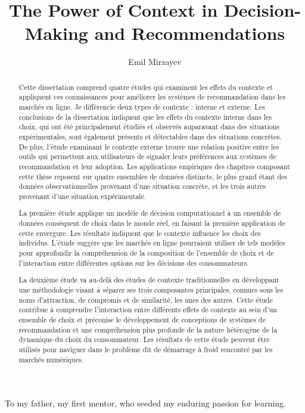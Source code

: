 \documentclass[a4paper,12pt]{article}
\title{{\bf \Large The Power of Context in Decision-Making and Recommendations}
}
\author{Emil Mirzayev}
\newenvironment{dedication}
  {%
   \thispagestyle{empty}%
   \vspace*{\stretch{1}}%
   \itshape             %
   \raggedleft          %
  }
  {\par %
   \vspace{\stretch{3}} %
   \clearpage           %
  }
\begin{document}
\begin{dedication}

To my father, my first mentor, who seeded my enduring passion for learning.

\end{dedication}

\maketitle

\clearpage
\begin{otherlanguage}{french}
\begin{abstract}

Cette dissertation comprend quatre études qui examinent les effets du contexte et appliquent ces connaissances pour améliorer les systèmes de recommandation dans les marchés en ligne. Je différencie deux types de contexte : interne et externe. Les conclusions de la dissertation indiquent que les effets du contexte interne dans les choix, qui ont été principalement étudiés et observés auparavant dans des situations expérimentales, sont également présents et détectables dans des situations concrètes. De plus, l'étude examinant le contexte externe trouve une relation positive entre les outils qui permettent aux utilisateurs de signaler leurs préférences aux systèmes de recommandation et leur adoption. Les applications empiriques des chapitres composant cette thèse reposent sur quatre ensembles de données distincts, le plus grand étant des données observationnelles provenant d'une situation concrète, et les trois autres provenant d'une situation expérimentale.

La première étude applique un modèle de décision computationnel à un ensemble de données conséquent de choix dans le monde réel, en faisant la première application de cette envergure. Les résultats indiquent que le contexte influence les choix des individus. L'étude suggère que les marchés en ligne pourraient utiliser de tels modèles pour approfondir la compréhension de la composition de l'ensemble de choix et de l'interaction entre différentes options sur les décisions des consommateurs.

La deuxième étude va au-delà des études de contexte traditionnelles en développant une méthodologie visant à séparer ses trois composantes principales, connues sous les noms d'attraction, de compromis et de similarité, les unes des autres. Cette étude contribue à comprendre l'interaction entre différents effets de contexte au sein d'un ensemble de choix et préconise le développement de conceptions de systèmes de recommandation et une compréhension plus profonde de la nature hétérogène de la dynamique du choix du consommateur. Les résultats de cette étude peuvent être utilisés pour naviguer dans le problème dit de démarrage à froid rencontré par les marchés numériques.


\end{abstract}
\end{otherlanguage}
\end{document}
